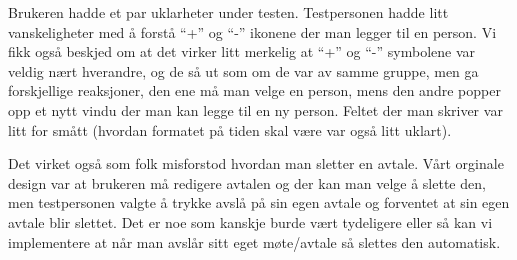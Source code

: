 Brukeren hadde et par uklarheter under testen. Testpersonen hadde litt vanskeligheter med å forstå “+” og “-” ikonene der man legger til en person. Vi fikk også beskjed om at det virker litt merkelig at “+” og “-” symbolene var veldig nært hverandre, og de så ut som om de var av samme  gruppe, men ga forskjellige reaksjoner, den ene må man velge en person, mens den andre popper opp et nytt vindu der man kan legge til en ny person.  Feltet der man skriver var litt for smått (hvordan formatet på tiden skal være var også litt uklart). 

Det virket også som folk misforstod hvordan man sletter en avtale. Vårt orginale design var at brukeren må redigere avtalen og der kan man velge å slette den, men testpersonen valgte å trykke avslå på sin egen avtale og forventet at sin egen avtale blir slettet. Det er noe som kanskje burde vært tydeligere eller så kan vi implementere at når man avslår sitt eget møte/avtale så slettes den automatisk. 